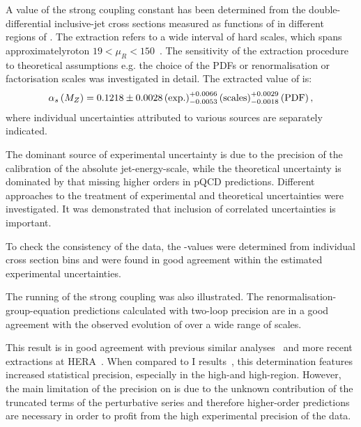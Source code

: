 A value of the strong coupling constant has been determined from the double-differential inclusive-jet cross sections measured as functions of \etjetb in different regions of \qsq. The extraction refers to a wide interval of hard scales, which spans approximatelyroton $19 < \mu_R < 150$~\GeV. The sensitivity of the extraction procedure to theoretical assumptions e.g. the choice of the PDFs or renormalisation or factorisation scales was investigated in detail. The extracted value of \asz is:
\begin{equation}
 \mbox{$\alpha_{s}\left(M_{Z}\right)$} = 0.1218 \pm 0.0028\left(\text{exp.}\right)^{+0.0066}_{-0.0053}\left(\text{scales}\right)^{+0.0029}_{-0.0018}\left(\text{PDF}\right),
\end{equation}
where individual uncertainties attributed to various sources are separately indicated. 

The dominant source of experimental uncertainty is due to the precision of the calibration of the absolute jet-energy-scale, while the theoretical uncertainty is dominated by that missing higher orders in pQCD predictions.
Different approaches to the treatment of experimental and theoretical uncertainties were investigated. It was demonstrated that inclusion of correlated uncertainties is important. 

To check the consistency of the data, the \asz-values were determined from individual cross section bins and were found in good agreement within the estimated experimental uncertainties.

The running of the strong coupling was also illustrated. The renormalisation-group-equation predictions calculated with two-loop precision are in a good agreement with the observed evolution of \as over a wide range of scales.
 
This result is in good agreement with previous similar analyses~\cite{HERAIjets} and more recent extractions at HERA~\cite{britzger}. When compared to \hera I results~\cite{}, this determination features increased statistical precision, especially in the high-\etjetb and high-\qsq region. However, the main limitation of the precision on \asz is due to the unknown contribution of the truncated terms of the perturbative series and therefore higher-order predictions are necessary in order to profit from the high experimental precision of the data.